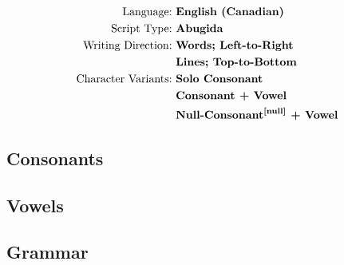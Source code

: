 \label{AbR}
\begin{align*}
\text{Language:}~           & \textbf{English~(Canadian)}             \\
\text{Script Type:}~        & \textbf{Abugida}                        \\
\text{Writing Direction:}~  & \textbf{Words;~Left-to-Right}           \\
                            & \textbf{Lines;~Top-to-Bottom}           \\
\text{Character Variants:}~ & \textbf{Solo~Consonant}                 \\
                            & \textbf{Consonant~+~Vowel}              \\
                            & \textbf{\super{Null-Consonant}{\cite{null}}~+~Vowel}%
\end{align*}

\newpage
\subsection{Consonants}


\newpage
\subsection{Vowels}


\newpage
\subsection{Grammar}
